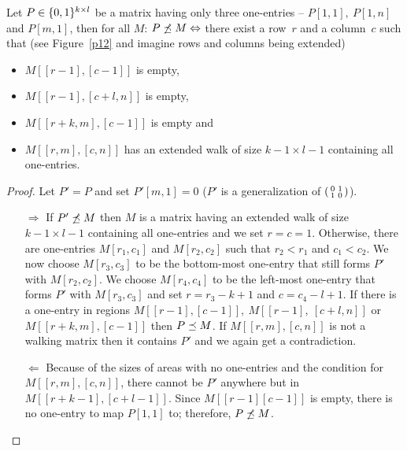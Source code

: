\begin{thm}
Let $P\in\{0,1\}^{k\times l}$ be a matrix having only three one-entries -- $P[1,1],\ P[1,n]$ and $P[m,1]$, then for all $M$: $P\not\preceq M\Leftrightarrow$ there exist a row~$r$ and a column~$c$ such that (see Figure~\ref{p12} and imagine rows and columns being extended)
\begin{itemize}
\item $M[[r-1],[c-1]]$ is empty,
\item $M[[r-1],[c+l,n]]$ is empty,
\item $M[[r+k,m],[c-1]]$ is empty and
\item $M[[r,m],[c,n]]$ has an extended walk of size $k-1\times l-1$ containing all one-entries.
\end{itemize}
\end{thm}
\begin{proof} Let $P'=P$ and set $P'[m,1]=0$ ($P'$ is a generalization of $\left(\begin{smallmatrix}0&1\\1&0\end{smallmatrix}\right)$). 
\begin{itemize}
\item[$\Rightarrow$] If $P'\not\preceq M$ then $M$ is a matrix having an extended walk of size $k-1\times l-1$ containing all one-entries and we set $r=c=1$. Otherwise, there are one-entries $M[r_1,c_1]$ and $M[r_2,c_2]$ such that $r_2<r_1$ and $c_1<c_2$. We now choose $M[r_3,c_3]$ to be the bottom-most one-entry that still forms $P'$ with $M[r_2,c_2]$. We choose $M[r_4,c_4]$ to be the left-most one-entry that forms $P'$ with $M[r_3,c_3]$ and set $r=r_3-k+1$ and $c=c_4-l+1$. If there is a one-entry in regions $M[[r-1],[c-1]],\ M[[r-1],\ [c+l,n]]$ or $M[[r+k,m],[c-1]]$ then $P\preceq M$. If $M[[r,m],[c,n]]$ is not a walking matrix then it contains $P'$ and we again get a contradiction.
\item[$\Leftarrow$] Because of the sizes of areas with no one-entries and the condition for $M[[r,m],[c,n]]$, there cannot be $P'$ anywhere but in $M[[r+k-1],[c+l-1]]$. Since $M[[r-1][c-1]]$ is empty, there is no one-entry to map $P[1,1]$ to; therefore, $P\not\preceq M$.
\end{itemize}
\end{proof}

